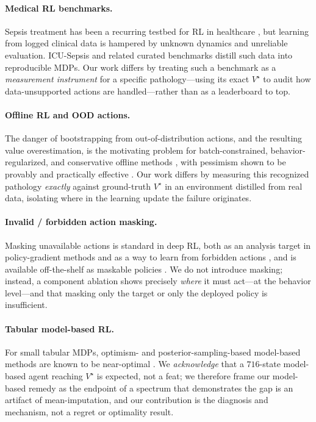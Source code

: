 \documentclass{article}
\begin{document}
\paragraph{Medical RL benchmarks.}
Sepsis treatment has been a recurring testbed for RL in healthcare
\citep{komorowski2018aiclinician,raghu2017continuous}, but learning from logged
clinical data is hampered by unknown dynamics and unreliable evaluation.
ICU-Sepsis \citep{choudhary2024icusepsis} and related curated benchmarks
\citep{mimic_sepsis_arxiv2510_24500} distill such data into reproducible MDPs.
Our work differs by treating such a benchmark as a \emph{measurement instrument}
for a specific pathology---using its exact $V^\star$ to audit how data-unsupported
actions are handled---rather than as a leaderboard to top.

\paragraph{Offline RL and OOD actions.}
The danger of bootstrapping from out-of-distribution actions, and the resulting
value overestimation, is the motivating problem for batch-constrained,
behavior-regularized, and conservative offline methods
\citep{fujimoto2019bcq,kumar2019bear,kumar2020cql}, with pessimism shown to be
provably and practically effective \citep{rashidinejad2021pessimism,jin2021pessimism}.
Our work differs by measuring this recognized pathology \emph{exactly} against
ground-truth $V^\star$ in an environment distilled from real data, isolating where
in the learning update the failure originates.

\paragraph{Invalid / forbidden action masking.}
Masking unavailable actions is standard in deep RL, both as an analysis target in
policy-gradient methods \citep{huang2021masking} and as a way to learn from
forbidden actions \citep{seurin2020forbidden}, and is available off-the-shelf as
maskable policies \citep{raffin2021sb3}. We
do not introduce masking; instead, a component ablation shows precisely \emph{where}
it must act---at the behavior level---and that masking only the target or only the
deployed policy is insufficient.

\paragraph{Tabular model-based RL.}
For small tabular MDPs, optimism- and posterior-sampling-based model-based methods
are known to be near-optimal \citep{auer2008ucrl,osband2013psrl}. We
\emph{acknowledge} that a $716$-state model-based agent reaching $V^\star$ is
expected, not a feat; we therefore frame our model-based remedy as the endpoint of
a spectrum that demonstrates the gap is an artifact of mean-imputation, and our
contribution is the diagnosis and mechanism, not a regret or optimality result.
\end{document}

